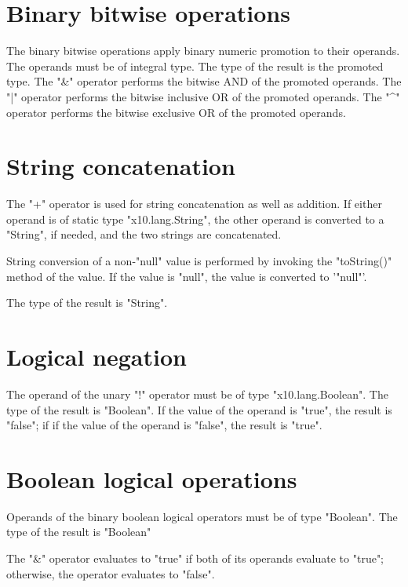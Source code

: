 \section{Binary bitwise operations}

The binary bitwise operations apply binary numeric promotion
to their operands. The operands must be of integral type.
The type of the result is the promoted type.
The \xcd"&" operator  performs the bitwise AND of the promoted operands.
The \xcd"|" operator  performs the bitwise inclusive OR of the promoted operands.
The \xcd"^" operator  performs the bitwise exclusive OR of the promoted operands.

\section{String concatenation}

The \xcd"+"  operator is used for string concatenation 
 as well as addition.
If either operand is of static type \xcd"x10.lang.String",
 the other operand is converted to a \xcd"String", if needed,
  and  the two strings  are concatenated.

 String conversion of a non-\xcd"null" value is  performed by invoking the
 \xcd"toString()" method of the value.
  If the value is \xcd"null", the value is converted to 
  \xcd'"null"'.

The type of the result is \xcd"String".

\section{Logical negation}

The operand of the  unary \xcd"!" operator 
must be of type \xcd"x10.lang.Boolean".
The type of the result is \xcd"Boolean".
If the value of the operand is \xcd"true", the result is \xcd"false"; if
if the value of the operand  is \xcd"false", the result is \xcd"true".

\section{Boolean logical operations}

Operands of the binary boolean logical operators must be of type \xcd"Boolean".
The type of the result is \xcd"Boolean"

The \xcd"&" operator  evaluates to \xcd"true" if both of its
operands evaluate to \xcd"true"; otherwise, the operator
evaluates to \xcd"false".

